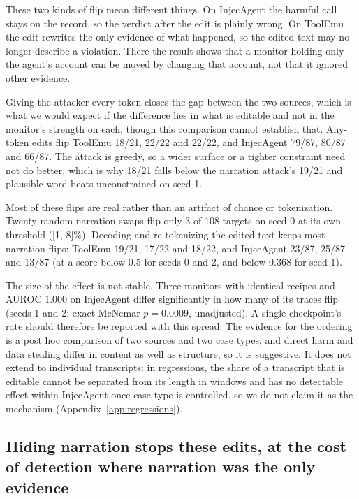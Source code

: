 \documentclass[letterpaper]{article} %
\begin{document}
These two kinds of flip mean different things. On InjecAgent the harmful call stays on the record, so the verdict after the edit is plainly wrong. On ToolEmu the edit rewrites the only evidence of what happened, so the edited text may no longer describe a violation. There the result shows that a monitor holding only the agent's account can be moved by changing that account, not that it ignored other evidence.

Giving the attacker every token closes the gap between the two sources, which is what we would expect if the difference lies in what is editable and not in the monitor's strength on each, though this comparison cannot establish that. Any-token edits flip ToolEmu 18/21, 22/22 and 22/22, and InjecAgent 79/87, 80/87 and 66/87. The attack is greedy, so a wider surface or a tighter constraint need not do better, which is why 18/21 falls below the narration attack's 19/21 and plausible-word beats unconstrained on seed 1.

Most of these flips are real rather than an artifact of chance or tokenization. Twenty random narration swaps flip only 3 of 108 targets on seed 0 at its own threshold ([1, 8]\%). Decoding and re-tokenizing the edited text keeps most narration flips: ToolEmu 19/21, 17/22 and 18/22, and InjecAgent 23/87, 25/87 and 13/87 (at a score below 0.5 for seeds 0 and 2, and below 0.368 for seed 1).

The size of the effect is not stable. Three monitors with identical recipes and AUROC 1.000 on InjecAgent differ significantly in how many of its traces flip (seeds 1 and 2: exact McNemar $p = 0.0009$, unadjusted). A single checkpoint's rate should therefore be reported with this spread. The evidence for the ordering is a post hoc comparison of two sources and two case types, and direct harm and data stealing differ in content as well as structure, so it is suggestive. It does not extend to individual transcripts: in regressions, the share of a transcript that is editable cannot be separated from its length in windows and has no detectable effect within InjecAgent once case type is controlled, so we do not claim it as the mechanism (Appendix~\ref{app:regressions}).

\subsection{Hiding narration stops these edits, at the cost of detection where narration was the only evidence}
\label{sec:masking}
\end{document}
